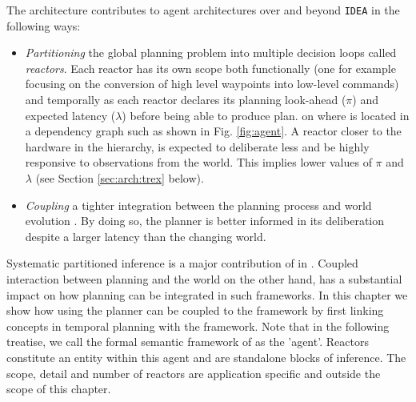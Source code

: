 The \rx architecture contributes to agent architectures over and
beyond \texttt{IDEA} in the following  ways:

\begin{itemize}

\item \emph{Partitioning} the global planning problem into multiple
  decision loops called {\em reactors}. Each reactor has its own scope
  both functionally (one for example focusing on the conversion of
  high level waypoints into low-level commands) and temporally as each
  reactor declares its planning look-ahead ($\pi$) and expected
  latency ($\lambda$) before being able to produce  plan.
   on where  is
  located in a dependency graph such as  shown in
  Fig. \ref{fig:agent}. A reactor closer to the hardware in the
  hierarchy, is expected to deliberate less and be highly responsive
  to observations from the world. This implies lower values of $\pi$
  and $\lambda$ (see Section \ref{sec:arch:trex} below). 

\item \emph{Coupling} a tighter integration between the planning
  process and world evolution . By doing so, the planner is better
  informed in its deliberation despite a larger latency than the
  changing world.
\end{itemize}

Systematic partitioned inference is a major contribution of \rx
{} in \cite{py10,
  rajan12}. Coupled interaction between planning and the world on the
other hand, has a substantial impact on how planning can be integrated
in such frameworks. In this chapter we show how using the \eu planner
can be coupled to the \rx framework by first linking concepts in
temporal planning with the framework. Note that in the following
treatise, we call the formal semantic framework of \rx as the
'agent'. Reactors constitute an entity within this agent and are
standalone blocks of inference. The scope, detail and number of
reactors are application specific and outside the scope of this
chapter.


